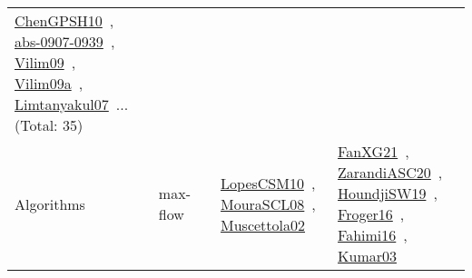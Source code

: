 {\begin{longtable}{lp{3cm}>{\raggedright\arraybackslash}p{6cm}>{\raggedright\arraybackslash}p{6cm}>{\raggedright\arraybackslash}p{8cm}}
\href{works/ChenGPSH10.pdf}{ChenGPSH10}~\cite{ChenGPSH10}, \href{works/abs-0907-0939.pdf}{abs-0907-0939}~\cite{abs-0907-0939}, \href{works/Vilim09.pdf}{Vilim09}~\cite{Vilim09}, \href{works/Vilim09a.pdf}{Vilim09a}~\cite{Vilim09a}, \href{works/Limtanyakul07.pdf}{Limtanyakul07}~\cite{Limtanyakul07}... (Total: 35)\\
Algorithms & max-flow &  & \href{works/LopesCSM10.pdf}{LopesCSM10}~\cite{LopesCSM10}, \href{works/MouraSCL08.pdf}{MouraSCL08}~\cite{MouraSCL08}, \href{works/Muscettola02.pdf}{Muscettola02}~\cite{Muscettola02} & \href{works/FanXG21.pdf}{FanXG21}~\cite{FanXG21}, \href{works/ZarandiASC20.pdf}{ZarandiASC20}~\cite{ZarandiASC20}, \href{works/HoundjiSW19.pdf}{HoundjiSW19}~\cite{HoundjiSW19}, \href{works/Froger16.pdf}{Froger16}~\cite{Froger16}, \href{works/Fahimi16.pdf}{Fahimi16}~\cite{Fahimi16}, \href{works/Kumar03.pdf}{Kumar03}~\cite{Kumar03}\\

\end{longtable}}
